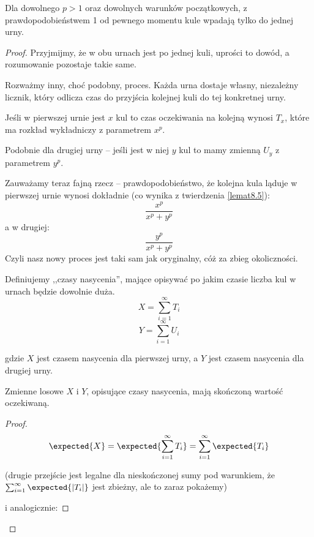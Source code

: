 \begin{theorem}
    Dla dowolnego \( p > 1 \) oraz dowolnych warunków początkowych, z prawdopodobieństwem 1 od pewnego momentu kule wpadają tylko do jednej urny.
\end{theorem}
\begin{proof}
    Przyjmijmy, że w obu urnach jest po jednej kuli, uprości to dowód, a rozumowanie pozostaje takie same.
    
    Rozważmy inny, choć podobny, proces.
    Każda urna dostaje własny, niezależny licznik, który odlicza czas do przyjścia kolejnej kuli do tej konkretnej urny.
    
    Jeśli w pierwszej urnie jest \( x \) kul to czas oczekiwania na kolejną wynosi \( T_x \), które ma rozkład wykładniczy z parametrem \( x^p \).
    
    Podobnie dla drugiej urny -- jeśli jest w niej \( y \) kul to mamy zmienną \( U_y \) z parametrem \( y^p \).
    
    Zauważamy teraz fajną rzecz -- prawdopodobieństwo, że kolejna kula ląduje w pierwszej urnie wynosi dokładnie (co wynika z twierdzenia \ref{lemat8.5}):
    \[
         \frac{x^p}{x^p + y^p}
    \]
    a w drugiej:
    \[
        \frac{y^p}{x^p + y^p}
    \]
    Czyli nasz nowy proces jest taki sam jak oryginalny, cóż za zbieg okoliczności.
    
    Definiujemy ,,czasy nasycenia'', mające opisywać po jakim czasie liczba kul w urnach będzie dowolnie duża.
    \[
        X = \sum_{i=1}^\infty T_i
    \]
    \[
        Y = \sum_{i=1}^\infty U_i
    \]
    
    gdzie \(X\) jest czasem nasycenia dla pierwszej urny, a \(Y\) jest czasem nasycenia dla drugiej urny. 
    
    \begin{lemma}
        Zmienne losowe \(X\) i \(Y\), opisujące czasy nasycenia, mają skończoną wartość oczekiwaną.
    \end{lemma}
    
    \begin{proof}
            
        \[ 
            \expected{X} = \expected{\sum_{i=1}^{\infty} T_i} = \sum_{i=1}^{\infty} \expected{T_i}
        \]
        
        (drugie przejście jest legalne dla nieskończonej sumy pod warunkiem, że \( \sum_{i=1}^{\infty} \expected{|T_i| }\) jest zbieżny, ale to zaraz pokażemy) 
        
        i analogicznie:
        

\end{proof}
\end{proof}
